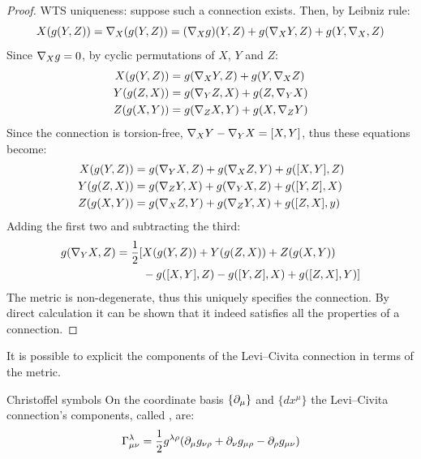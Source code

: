 \begin{proofbox}
  \begin{proof}
    WTS uniqueness: suppose such a connection exists. Then, by Leibniz rule:
    \begin{equation*}
      X(g(Y,Z)) = \nabla_X (g(Y,Z)) = (\nabla_X g)(Y,Z) + g(\nabla_X Y, Z) + g(Y, \nabla_X, Z)
    \end{equation*}
    Since $ \nabla_X g = 0 $, by cyclic permutations of $ X $, $ Y $ and $ Z $:
    \begin{equation*}
      \begin{split}
        X(g(Y,Z)) &= g(\nabla_X Y, Z) + g(Y, \nabla_X Z) \\
        Y(g(Z,X)) &= g(\nabla_Y Z, X) + g(Z, \nabla_Y X) \\
        Z(g(X,Y)) &= g(\nabla_Z X, Y) + g(X, \nabla_Z Y)
      \end{split}
    \end{equation*}
    Since the connection is torsion-free, $ \nabla_X Y - \nabla_Y X = [X,Y] $, thus these equations become:
    \begin{equation*}
      \begin{split}
        X(g(Y,Z)) &= g(\nabla_Y X, Z) + g(\nabla_X Z, Y) + g([X,Y], Z) \\
        Y(g(Z,X)) &= g(\nabla_Z Y, X) + g(\nabla_Y X, Z) + g([Y,Z], X) \\
        Z(g(X,Y)) &= g(\nabla_X Z, Y) + g(\nabla_Z Y, X) + g([Z,X], y)
      \end{split}
    \end{equation*}
    Adding the first two and subtracting the third:
    \begin{equation*}
      \begin{split}
        g(\nabla_Y X, Z) = \frac{1}{2} [ & X(g(Y,Z)) + Y(g(Z,X)) + Z(g(X,Y)) \\
                                      & - g([X,Y],Z) - g([Y,Z],X) + g([Z,X],Y) ]
      \end{split}
    \end{equation*}
    The metric is non-degenerate, thus this uniquely specifies the connection. By direct calculation it can be shown that it indeed satisfies all the properties of a connection.
  \end{proof}
\end{proofbox}

It is possible to explicit the components of the Levi--Civita connection in terms of the metric.

\begin{proposition}{Christoffel symbols}{}
  On the coordinate basis $ \{\partial_\mu\} $ and $ \{dx^\mu\} $ the Levi--Civita connection's components, called , are:
  \begin{equation}
    \Gamma^\lambda_{\mu \nu} = \frac{1}{2} g^{\lambda \rho} (\partial_\mu g_{\nu \rho} + \partial_\nu g_{\mu \rho} - \partial_\rho g_{\mu \nu})
  \end{equation}
\end{proposition}

